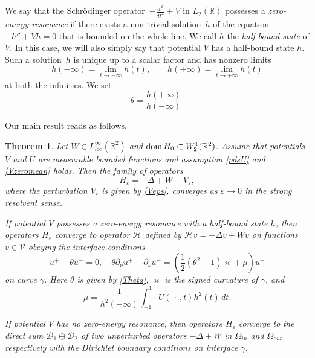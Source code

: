 \documentclass[reqno]{amsart}
\theoremstyle{plain}
\newtheorem{thm}{Theorem}
\numberwithin{equation}{section}
\newcommand{\dom}{\mathop{\rm dom}}
\renewcommand{\kappa}{\varkappa}
\newcommand{\Real}{\mathbb R}
\newcommand{\eps}{\varepsilon}
\renewcommand{\emph}[1]{{\textit{#1}}}
\begin{document}
We say that the Schr\"odinger operator~$-\frac{d^2}{d t^2}+V$ in $L_2(\Real)$ possesses a \emph{zero-energy resonance}  if there exists a non trivial solution~$h$ of the equation $-h'' +Vh= 0$ that is bounded on the whole line.  We call $h$ the \emph{half-bound state} of $V$. In this case, we will also simply say that potential $V$ has a half-bound state $h$. Such a solution~$h$ is  unique up to a scalar factor and has nonzero limits
\begin{equation*}
  h(-\infty)=\lim\limits_{t\to-\infty}h(t), \qquad
  h(+\infty)=\lim\limits_{t\to+\infty}h(t)
\end{equation*}
at both the infinities. We set
\begin{equation}\label{Theta}
  \theta=\frac{h(+\infty)}{h(-\infty)}.
\end{equation}



Our main result reads as follows.


\begin{thm}\label{MainThrm}
Let $W\in L^\infty_{loc}(\Real^2)$ and  $\dom H_0\subset W_2^1(\Real^2)$.
Assume  that potentials $V$ and $U$  are measurable bounded functions and assumption \eqref{pdsU} and \eqref{Vzeromean}  holds.
Then the family of operators
\begin{equation*}
 H_\eps=-\Delta +W+V_\eps,
\end{equation*}
where the perturbation $V_\eps$ is given by \eqref{Veps},
converges as $\eps\to 0$ in the strong resolvent sense.

If potential $V$ possesses a zero-energy resonance with a half-bound state $h$, then operators $H_\eps$ converge to  operator $\mathcal{H}$
defined by
$
\mathcal{H} v=-\Delta v+Wv
$
on functions $v\in \mathcal{V}$  obeying the interface conditions
\begin{equation}\label{ConnectedCond}
 u^+-\theta u^-=0,\quad  \theta\partial_\nu u^+-\partial_\nu u^-
=\left(\textstyle\frac{1}{2 }(\theta^2-1)\kappa+\mu\right) u^-
\end{equation}
on curve $\gamma$. Here  $\theta$ is given by  \eqref{Theta},  $\kappa$ is the signed curvature of $\gamma$, and
\begin{equation}\label{Mu}
  \mu=\frac{1}{h^2(-\infty)} \int_{-1}^1 U(\,\cdot\,,t)h^2(t)\, dt.
\end{equation}


If potential $V$ has no zero-energy resonance, then operators $H_\eps$ converge to the direct sum $\mathcal{D}_1\oplus\mathcal{D}_2$ of two unperturbed operators $-\Delta +W$ in $\Omega_{in}$ and $\Omega_{out}$ respectively with the Dirichlet boundary conditions on interface $\gamma$.
\end{thm}
\end{document}
